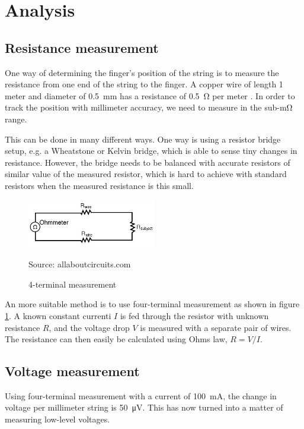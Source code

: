 \documentclass{article}
\newcommand{\source}[1]{\hfill \vspace{-15pt} \caption*{ \footnotesize Source: {#1}} }
\begin{document}
\section{Analysis}

\subsection{Resistance measurement} \label{sec:resistance_measurement}
One way of determining the finger's position of the string is to measure the resistance from one end of the string to the finger. A copper wire of length 1 meter and diameter of \SI{0.5}{mm} has a resistance of \SI{0.5}{\ohm} per meter \cite{copperresistance}. In order to track the position  with millimeter accuracy, we need to measure in the sub-\si{\milli\ohm} range. 

This can be done in many different ways. One way is using a resistor bridge setup, e.g. a Wheatstone or Kelvin bridge, which is able to sense tiny changes in resistance. However, the bridge needs to be balanced with accurate resistors of similar value of the measured resistor, which is hard to achieve with standard resistors when the measured resistance is this small.

\begin{figure}[ht]
  \centering
  \includegraphics[width=0.5\textwidth]{4-wire-sensing}
  \caption{4-terminal measurement}
  \source{allaboutcircuits.com}
  \label{fig:4terminal}
\end{figure}

An more suitable method is to use four-terminal measurement as shown in figure \ref{fig:4terminal}. A known constant currenti $I$ is fed through the resistor with unknown resistance $R$, and the voltage drop $V$ is measured with a separate pair of wires. The resistance can then easily be calculated using Ohms law, $ R = V / I $.

\subsection{Voltage measurement} \label{sec:voltage_measurement}
Using four-terminal measurement with a current of \SI{100}{\milli\ampere}, the change in voltage per millimeter string is \SI{50}{\micro\volt}. This has now turned into a matter of measuring low-level voltages.
\end{document}

